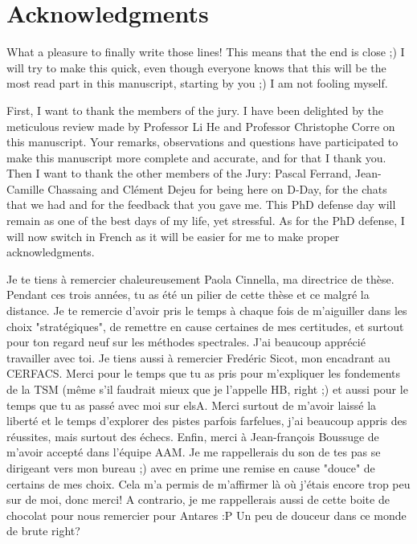 
\chapter*{Acknowledgments}
\thispagestyle{empty}

What a pleasure to finally write those lines! This means that
the end is close ;)
I will try to make this quick, even though everyone knows that this
will be the most read part in this manuscript, starting by you ;)
I am not fooling myself.

First, I want to thank the members of the jury. I have been
delighted by the meticulous review made by Professor Li He and Professor 
Christophe Corre on this manuscript. Your remarks, observations
and questions
have participated to make this manuscript more complete and accurate, and
for that I thank you.
Then I want to thank the other members of the Jury: Pascal Ferrand, 
Jean-Camille Chassaing and Clément Dejeu for being here on D-Day,
for the chats that we had
and for the feedback that you gave me. This PhD defense day will remain as one of the
best days of my life, yet stressful.
As for the PhD defense, I will now switch in French as it will
be easier for me to make proper acknowledgments.

Je te tiens à remercier chaleureusement Paola Cinnella, ma
directrice de thèse. Pendant ces trois années, tu as été un pilier
de cette thèse et ce malgré la distance. 
Je te remercie d'avoir pris le temps à chaque fois
de m'aiguiller dans les choix "stratégiques", de remettre en cause
certaines de mes certitudes, et surtout pour ton regard neuf sur les méthodes
spectrales. J'ai beaucoup apprécié travailler avec toi.
Je tiens aussi à remercier Fredéric Sicot, mon encadrant au CERFACS.
Merci pour le temps que tu as pris pour m'expliquer les fondements de 
la TSM (même s'il faudrait mieux que je l'appelle HB, right ;)
et aussi pour le temps que tu as passé avec moi sur elsA. 
Merci surtout de m'avoir laissé la liberté et le temps
d'explorer des pistes parfois farfelues, j'ai beaucoup appris 
des réussites, mais surtout des échecs. Enfin, merci à Jean-françois Boussuge
de m'avoir accepté dans l'équipe AAM.
Je me rappellerais du son
de tes pas se dirigeant vers mon bureau ;) avec
en prime une remise en cause "douce" de certains de mes choix.
Cela m'a permis de m'affirmer là où j'étais encore trop
peu sur de moi, donc merci! A contrario, je me rappellerais aussi 
de cette boite de chocolat pour nous remercier pour Antares :P
Un peu de douceur dans ce monde de brute right?

